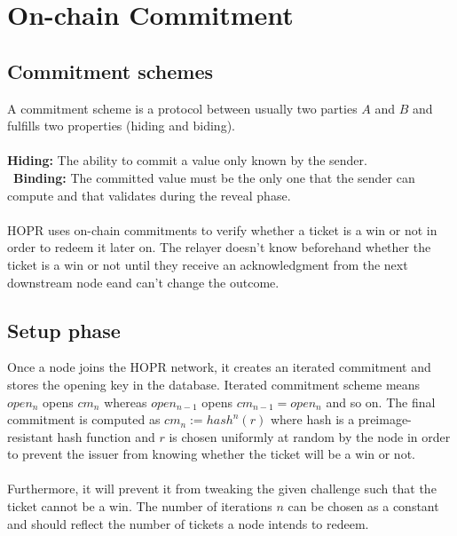 \section{On-chain Commitment}

\subsection*{Commitment schemes}
A commitment scheme is a protocol between usually two parties $A$ and $B$ and fulfills two properties (hiding and biding).
\\~\\\textbf{Hiding:} The ability to commit a value only known by the sender.
\\~\textbf{Binding:} The committed value must be the only one that the sender can compute and that validates during the reveal phase. 
\\~\\HOPR uses on-chain commitments to verify whether a ticket is a win or not in order to redeem it later on. The relayer doesn't know beforehand whether the ticket is a win or not until they receive an acknowledgment from the next downstream node eand can't change the outcome.
\subsection{Setup phase}
Once a node joins the HOPR network, it creates an iterated commitment and stores the opening key in the database. 
Iterated commitment scheme means $open_n$ opens $cm_n$ whereas $open_{n-1}$ opens $cm_{n-1}=open_n$ and so on. 
\newline The final commitment is computed as $cm_n:= hash^n(r)$ where hash is a preimage-resistant hash function and 
$r$ is chosen uniformly at random by the node in order to prevent the issuer from knowing whether the ticket will be a win or not. 
\\~\\ Furthermore, it will prevent it from tweaking the given challenge such that the ticket cannot be a win.
The number of iterations $n$ can be chosen as a constant and should reflect the number of tickets a node intends to redeem.

